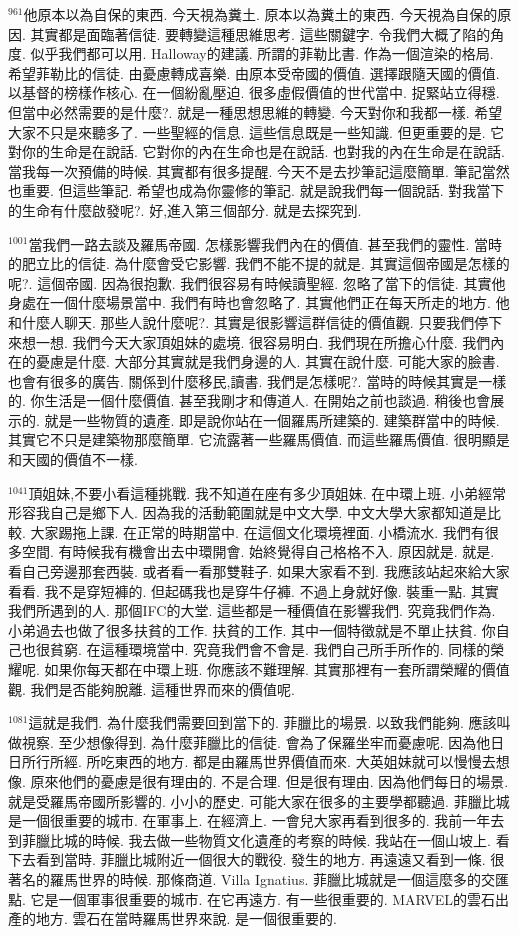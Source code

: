 \documentclass{book}
\begin{document}
$^{961}$他原本以為自保的東西.
今天視為糞土.
原本以為糞土的東西.
今天視為自保的原因.
其實都是面臨著信徒.
要轉變這種思維思考.
這些關鍵字.
令我們大概了陷的角度.
似乎我們都可以用.
Halloway的建議.
所謂的菲勒比書.
作為一個渲染的格局.
希望菲勒比的信徒.
由憂慮轉成喜樂.
由原本受帝國的價值.
選擇跟隨天國的價值.
以基督的榜樣作核心.
在一個紛亂壓迫.
很多虛假價值的世代當中.
捉緊站立得穩.
但當中必然需要的是什麼?.
就是一種思想思維的轉變.
今天對你和我都一樣.
希望大家不只是來聽多了.
一些聖經的信息.
這些信息既是一些知識.
但更重要的是.
它對你的生命是在說話.
它對你的內在生命也是在說話.
也對我的內在生命是在說話.
當我每一次預備的時候.
其實都有很多提醒.
今天不是去抄筆記這麼簡單.
筆記當然也重要.
但這些筆記.
希望也成為你靈修的筆記.
就是說我們每一個說話.
對我當下的生命有什麼啟發呢?.
好,進入第三個部分.
就是去探究到.

$^{1001}$當我們一路去談及羅馬帝國.
怎樣影響我們內在的價值.
甚至我們的靈性.
當時的肥立比的信徒.
為什麼會受它影響.
我們不能不提的就是.
其實這個帝國是怎樣的呢?.
這個帝國.
因為很抱歉.
我們很容易有時候讀聖經.
忽略了當下的信徒.
其實他身處在一個什麼場景當中.
我們有時也會忽略了.
其實他們正在每天所走的地方.
他和什麼人聊天.
那些人說什麼呢?.
其實是很影響這群信徒的價值觀.
只要我們停下來想一想.
我們今天大家頂姐妹的處境.
很容易明白.
我們現在所擔心什麼.
我們內在的憂慮是什麼.
大部分其實就是我們身邊的人.
其實在說什麼.
可能大家的臉書.
也會有很多的廣告.
關係到什麼移民,讀書.
我們是怎樣呢?.
當時的時候其實是一樣的.
你生活是一個什麼價值.
甚至我剛才和傳道人.
在開始之前也談過.
稍後也會展示的.
就是一些物質的遺產.
即是說你站在一個羅馬所建築的.
建築群當中的時候.
其實它不只是建築物那麼簡單.
它流露著一些羅馬價值.
而這些羅馬價值.
很明顯是和天國的價值不一樣.

$^{1041}$頂姐妹,不要小看這種挑戰.
我不知道在座有多少頂姐妹.
在中環上班.
小弟經常形容我自己是鄉下人.
因為我的活動範圍就是中文大學.
中文大學大家都知道是比較.
大家踢拖上課.
在正常的時期當中.
在這個文化環境裡面.
小橋流水.
我們有很多空間.
有時候我有機會出去中環開會.
始終覺得自己格格不入.
原因就是.
就是.
看自己旁邊那套西裝.
或者看一看那雙鞋子.
如果大家看不到.
我應該站起來給大家看看.
我不是穿短褲的.
但起碼我也是穿牛仔褲.
不過上身就好像.
裝重一點.
其實我們所遇到的人.
那個IFC的大堂.
這些都是一種價值在影響我們.
究竟我們作為.
小弟過去也做了很多扶貧的工作.
扶貧的工作.
其中一個特徵就是不單止扶貧.
你自己也很貧窮.
在這種環境當中.
究竟我們會不會是.
我們自己所手所作的.
同樣的榮耀呢.
如果你每天都在中環上班.
你應該不難理解.
其實那裡有一套所謂榮耀的價值觀.
我們是否能夠脫離.
這種世界而來的價值呢.

$^{1081}$這就是我們.
為什麼我們需要回到當下的.
菲臘比的場景.
以致我們能夠.
應該叫做視察.
至少想像得到.
為什麼菲臘比的信徒.
會為了保羅坐牢而憂慮呢.
因為他日日所行所經.
所吃東西的地方.
都是由羅馬世界價值而來.
大英姐妹就可以慢慢去想像.
原來他們的憂慮是很有理由的.
不是合理.
但是很有理由.
因為他們每日的場景.
就是受羅馬帝國所影響的.
小小的歷史.
可能大家在很多的主要學都聽過.
菲臘比城是一個很重要的城市.
在軍事上.
在經濟上.
一會兒大家再看到很多的.
我前一年去到菲臘比城的時候.
我去做一些物質文化遺產的考察的時候.
我站在一個山坡上.
看下去看到當時.
菲臘比城附近一個很大的戰役.
發生的地方.
再遠遠又看到一條.
很著名的羅馬世界的時候.
那條商道.
Villa Ignatius.
菲臘比城就是一個這麼多的交匯點.
它是一個軍事很重要的城市.
在它再遠方.
有一些很重要的.
MARVEL的雲石出產的地方.
雲石在當時羅馬世界來說.
是一個很重要的.
\end{document}
